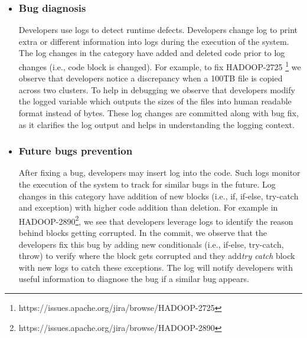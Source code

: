 \begin{itemize}
	

\item \subsubsection*{Bug diagnosis} Developers use logs to detect runtime defects. Developers change log to print extra or different information into logs during the execution of the system. The log changes in the category have added and deleted code prior to log changes (i.e., code block is changed). For example, to fix HADOOP-2725 \footnote{https://issues.apache.org/jira/browse/HADOOP-2725} we observe that developers notice a discrepancy when a 100TB file is copied across two clusters. To help in debugging we observe that developers modify the logged variable which outputs the sizes of the files into human readable format instead of bytes. These log changes are committed along with bug fix, as it clarifies the log output and helps in understanding the logging context.


\item \subsubsection*{Future bugs prevention} After fixing a bug, developers may insert log into the code. Such logs monitor the execution of the system to track for similar bugs in the future. Log changes in this category have addition of new blocks (i.e., if, if-else, try-catch and exception) with higher code addition than deletion. For example in HADOOP-2890\footnote{https://issues.apache.org/jira/browse/HADOOP-2890}, we see that developers leverage logs to identify the reason behind blocks getting corrupted. In the commit, we observe that the developers fix this bug by adding new conditionals (i.e., if-else, try-catch, throw) to verify where the block gets corrupted and they add\textsl{try catch} block with new logs to catch these exceptions. The log will notify developers with useful information to diagnose the bug if a similar bug appears.


\end{itemize}
